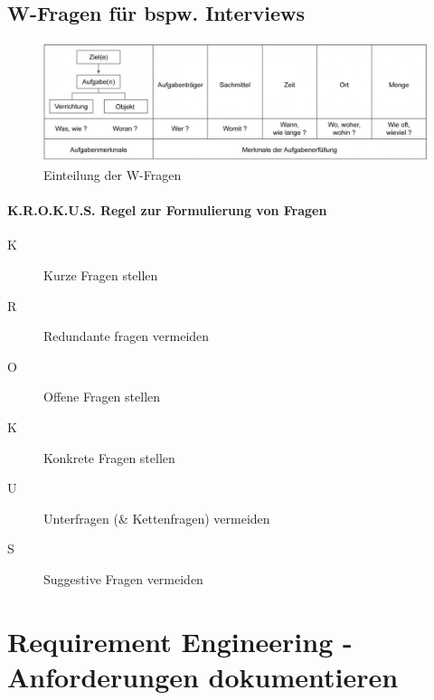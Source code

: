 \documentclass[a4paper]{article}
\begin{document}
		\subsection{W-Fragen für bspw. Interviews}
		
		\begin{figure}[!htb]
			\centering
			\includegraphics[height=3.5cm]{img/re/02/w_fragen.png}
			\caption{Einteilung der W-Fragen}
			\label{fig:re_w_fragen}
		\end{figure}
	
			\paragraph{K.R.O.K.U.S. Regel zur Formulierung von Fragen}
			
			\begin{description}
				\item[K] Kurze Fragen stellen
				\item[R] Redundante fragen vermeiden
				\item[O] Offene Fragen stellen
				\item[K] Konkrete Fragen stellen
				\item[U] Unterfragen (\& Kettenfragen) vermeiden
				\item[S] Suggestive Fragen vermeiden
			\end{description}
	
\newpage

	\section{Requirement Engineering - Anforderungen dokumentieren}
	
	
	
	
	
	
	
	
	
\end{document}
